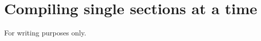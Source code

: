 \documentclass[a4paper, 12pt, draft]{book}
\begin{document}
\chapter{Compiling single sections at a time}
For writing purposes only.

\iffalse

\chapter{Theory Part II \comment{(need to rename)}}
\comment{Describe analytical models, numerical models (omega), simulations (eris) and that I compare the two latter}
\comment{Results from omega can be compared to hydrodynamical simulations like eris. Which are much more detialed and precise, but also more computationally expensive.}
\setlength{\figwidth}{0.8\linewidth}



\fi




\end{document}
